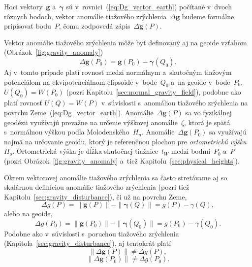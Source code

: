 \documentclass[a4paper,12pt]{book}
\let\vec\mathbf
\begin{document}
Hoci vektory~$\vec g$ a~$\boldsymbol\gamma$ sú 
v~rovnici~(\ref{eq:Dg_vector_earth}) počítané v~dvoch rôznych bodoch, vektor 
anomálie tiažového zrýchlenia~$\Delta \vec g$ budeme formálne pripisovať 
bodu~$P$, čomu zodpovedá zápis~$\Delta \vec g(P)$.

Vektor anomálie tiažového zrýchlenia môže byť definovaný aj na geoide vzťahom 
(Obrázok~\ref{fig:gravity_anomaly})
%
\begin{equation}
\label{eq:Dg_vector_geoid}
\Delta \vec g(P_0) = \vec g(P_0) - \boldsymbol\gamma(Q_0){.}
\end{equation}
%
Aj v~tomto prípade platí rovnosť medzi normálnym a~skutočným tiažovým 
potenciálom na ekvipotenciálnom elipsoide v~bode~$Q_0$ a~na geoide 
v~bode~$P_0$, $U(Q_0) = W(P_0)$ (pozri 
Kapitolu~\ref{sec:normal_gravity_field}), podobne ako platí rovnosť $U(Q) 
= W(P)$ v~súvislosti s~anomáliou tiažového zrýchlenia na povrchu 
Zeme~(\ref{eq:Dg_vector_earth}).  Anomálie~$\Delta \vec g(P)$ sa vo fyzikálnej 
geodézii využívajú prevažne na určenie výškovej anomálie~$\zeta$, ktorá je 
spätá s~normálnou výškou podľa Molodenského~$H_n$.  Anomálie~$\Delta \vec 
g(P_0)$ sa využívajú najmä na určovanie geoidu, ktorý je referenčnou plochou 
pre \emph{ortometrickú výšku}~$H_o$.  Ortometrická výška je dĺžka skutočnej 
tiažnice~$t_W$ medzi bodmi~$P_0$ a~$P$ (pozri Obrázok~\ref{fig:gravity_anomaly} 
a~tiež Kapitolu~\ref{sec:physical_heights}).

Okrem vektorovej anomálie tiažového zrýchlenia sa často stretávame aj so 
skalárnou definíciou anomálie tiažového zrýchlenia (pozri tiež 
Kapitolu~\ref{sec:gravity_disturbance}), či už na povrchu Zeme,
%
\begin{equation}
\label{eq:Dg_scalar_earth}
\Delta g(P) = \| \vec g(P) \| - \| \boldsymbol \gamma (Q) \| = g(P) 
- \gamma(Q){,}
\end{equation}
%
alebo na geoide,
%
\begin{equation}
\label{eq:Dg_scalar_geoid}
\Delta g(P_0) = \| \vec g(P_0) \| - \| \boldsymbol \gamma (Q_0) \| = g(P_0) 
- \gamma(Q_0){.}
\end{equation}
%
Podobne ako v~súvislosti s~poruchou tiažového zrýchlenia 
(Kapitola~\ref{sec:gravity_disturbance}), aj tentokrát platí
%
\begin{equation}
\| \Delta \vec g(P) \| \neq \Delta g(P){,}
\end{equation}
%
\begin{equation}
\| \Delta \vec g(P_0) \| \neq \Delta g(P_0){.}
\end{equation}
\end{document}
